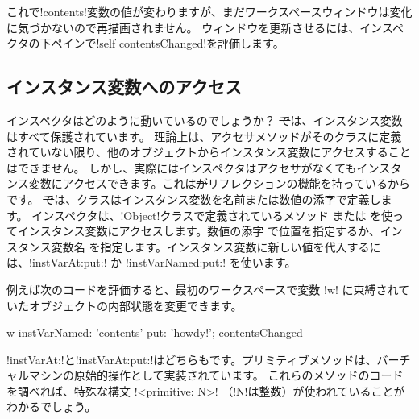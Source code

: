 \documentclass[a4paper,10pt,twoside]{book}
\begin{document}
これで\ct!contents!変数の値が変わりますが、まだワークスペースウィンドウは変化に気づかないので再描画されません。
ウィンドウを更新させるには、インスペクタの下ペインで\ct!self contentsChanged!を評価します。

\subsection{インスタンス変数へのアクセス}

インスペクタはどのように動いているのでしょうか？
\st では、インスタンス変数はすべて保護されています。
理論上は、アクセサメソッドがそのクラスに定義されていない限り、他のオブジェクトからインスタンス変数にアクセスすることはできません。
しかし、実際にはインスペクタはアクセサがなくてもインスタンス変数にアクセスできます。これは\st がリフレクションの機能を持っているからです。
\st では、クラスはインスタンス変数を名前または数値の添字で定義します。
インスペクタは、\ct!Object!クラスで定義されているメソッド  または  を使ってインスタンス変数にアクセスします。数値の添字  で位置を指定するか、インスタンス変数名  を指定します。インスタンス変数に新しい値を代入するには、\ct!instVarAt:put:! か \ct!instVarNamed:put:! を使います。

例えば次のコードを評価すると、最初のワークスペースで変数 \ct!w! に束縛されていたオブジェクトの内部状態を変更できます。

\begin{code}{}
w instVarNamed: 'contents' put: 'howdy!'; contentsChanged
\end{code}


\ct!instVarAt:!と\ct!instVarAt:put:!はどちらもです。プリミティブメソッドは、バーチャルマシンの原始的操作として実装されています。
これらのメソッドのコードを調べれば、特殊な構文 \ct!<primitive: N>! （\ct!N!は整数）が使われていることがわかるでしょう。
\end{document}

